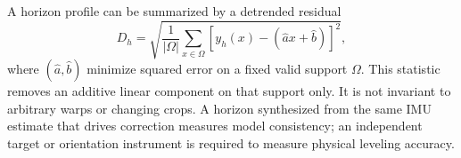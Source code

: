 A horizon profile can be summarized by a detrended residual
\begin{equation}
 D_h=\sqrt{\frac{1}{|\Omega|}\sum_{x\in\Omega}
 [y_h(x)-(\hat a x+\hat b)]^2},
 \label{eq:dhr}
\end{equation}
where $(\hat a,\hat b)$ minimize squared error on a fixed valid support $\Omega$. This statistic removes an additive linear component on that support only. It is not invariant to arbitrary warps or changing crops. A horizon synthesized from the same IMU estimate that drives correction measures model consistency; an independent target or orientation instrument is required to measure physical leveling accuracy.
